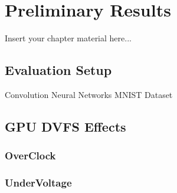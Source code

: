 
\chapter{Preliminary Results}
\label{chapter:preliminaryresults}

Insert your chapter material here...

\section{Evaluation Setup}
Convolution Neural Networks
MNIST Dataset


\section{GPU DVFS Effects}
\label{section:solarch}

\subsection{OverClock}
\label{section:underclock}

\subsection{UnderVoltage}




